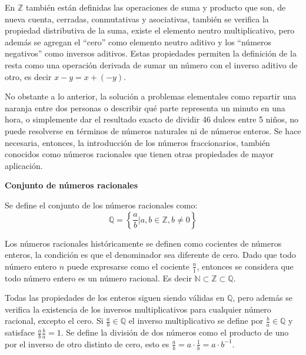 	En $\mathbb{Z}$ también están definidas las operaciones de suma y producto que son, de nueva cuenta, cerradas, conmutativas y asociativas, también se verifica la propiedad distributiva de la suma, existe el elemento neutro multiplicativo, pero además se agregan el ``cero'' como elemento neutro aditivo y los ``números negativos'' como inversos aditivos. Estas propiedades permiten la definición de la resta como una operación derivada de sumar un número con el inverso aditivo de otro, es decir $x-y = x + (-y)$.
	
	No obstante a lo anterior, la solución a problemas elementales como repartir una naranja entre dos personas o describir qué parte representa un minuto en una hora, o simplemente dar el resultado exacto de dividir 46 dulces entre 5 niños, no puede resolverse en términos de números naturales ni de números enteros. Se hace necesaria, entonces, la introducción de los números fraccionarios, también conocidos como números racionales que tienen otras propiedades de mayor aplicación.
	
	\vspace{0.21cm}
\begin{tcolorbox}
	\begin{defi}\textbf{Conjunto de números racionales}\end{defi}
	Se define el conjunto de los números racionales como:
		  \[ \mathbb{Q} = \left\{ \frac{a}{b} \biggr| a,b \in \mathbb{Z}, b\neq 0 \right\} \]
\end{tcolorbox}
	
	Los números racionales históricamente se definen como cocientes de números enteros, la condición es que el denominador sea diferente de cero. Dado que todo número entero $n$ puede expresarse como el cociente  $\frac{n}{1}$, entonces se considera que todo número entero es un número racional. Es decir $\mathbb{N} \subset \mathbb{Z} \subset \mathbb{Q}$.
	
Todas las propiedades de los enteros siguen siendo válidas en $\mathbb{Q}$, pero además se verifica la existencia de los inversos multiplicativos para cualquier número racional, excepto el cero. Si $\frac{a}{b} \in \mathbb{Q}$ el inverso multiplicativo se define por  $\frac{b}{a} \in \mathbb{Q}$ y satisface  $\frac{a}{b} \frac{b}{a} = 1$. Se define la división de dos números como el producto de uno por el inverso de otro distinto de cero, esto es $\frac{a}{b} = a \cdot \frac{1}{b} = a \cdot b^{-1}$.
	
